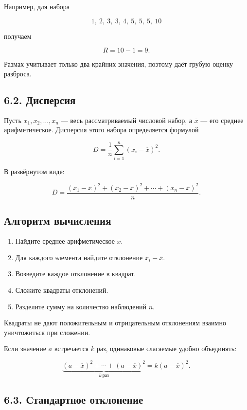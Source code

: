 \documentclass[a4paper,12pt]{article}
\begin{document}
Например, для набора

\[
1,\ 2,\ 3,\ 3,\ 4,\ 5,\ 5,\ 5,\ 10
\]

получаем

\[
R=10-1=9.
\]

Размах учитывает только два крайних значения, поэтому даёт грубую оценку разброса.

\subsection*{6.2. Дисперсия}

Пусть $x_1,x_2,\ldots,x_n$ --- весь рассматриваемый числовой набор, а $\overline{x}$ --- его среднее арифметическое. Дисперсия этого набора определяется формулой

\[
D
=
\frac{1}{n}
\sum_{i=1}^{n}(x_i-\overline{x})^2.
\]

В развёрнутом виде:

\[
D
=
\frac{
(x_1-\overline{x})^2+
(x_2-\overline{x})^2+
\cdots+
(x_n-\overline{x})^2
}{n}.
\]

\subsection*{Алгоритм вычисления}

\begin{enumerate}
    \item Найдите среднее арифметическое $\overline{x}$.
    \item Для каждого элемента найдите отклонение $x_i-\overline{x}$.
    \item Возведите каждое отклонение в квадрат.
    \item Сложите квадраты отклонений.
    \item Разделите сумму на количество наблюдений $n$.
\end{enumerate}

Квадраты не дают положительным и отрицательным отклонениям взаимно уничтожиться при сложении.

Если значение $a$ встречается $k$ раз, одинаковые слагаемые удобно объединять:

\[
\underbrace{(a-\overline{x})^2+\cdots+(a-\overline{x})^2}_{k\ \text{раз}}
=
k(a-\overline{x})^2.
\]

\subsection*{6.3. Стандартное отклонение}
\end{document}
